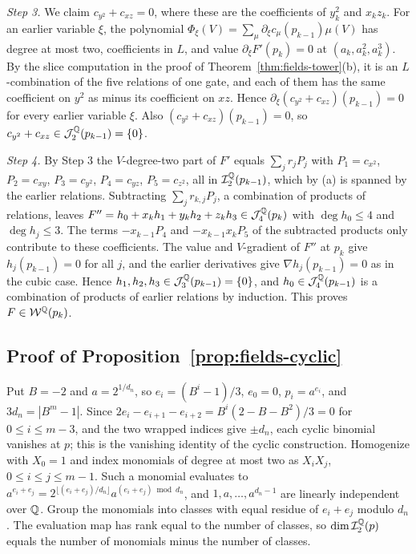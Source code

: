 \emph{Step 3.} We claim $c_{y^2}+c_{xz}=0$, where these are the coefficients
of $y_k^2$ and $x_kz_k$. For an earlier variable $\xi$, the polynomial
$\Phi_\xi(V)=\sum_\mu\partial_\xi c_\mu(p_{k-1})\mu(V)$ has degree at most two,
coefficients in $L$, and value $\partial_\xi F'(p_k)=0$ at
$(a_k,a_k^2,a_k^3)$. By the slice computation in the proof of
Theorem~\ref{thm:fields-tower}(b), it is an $L$-combination of the five
relations of one gate, and each of them has the same coefficient on $y^2$ as
minus its coefficient on $xz$. Hence $\partial_\xi(c_{y^2}+c_{xz})(p_{k-1})=0$
for every earlier variable $\xi$. Also $(c_{y^2}+c_{xz})(p_{k-1})=0$, so
$c_{y^2}+c_{xz}\in\mathcal J_2^\mathbb Q(p_{k-1})=\{0\}$.

\emph{Step 4.} By Step 3 the $V$-degree-two part of $F'$ equals
$\sum_j\hat r_jP_j$ with $P_1=c_{x^2}$, $P_2=c_{xy}$, $P_3=c_{y^2}$,
$P_4=c_{yz}$, $P_5=c_{z^2}$, all in $\mathcal I_2^\mathbb Q(p_{k-1})$, which by (a)
is spanned by the earlier relations. Subtracting $\sum_jr_{k,j}P_j$, a
combination of products of relations, leaves
$F''=h_0+x_kh_1+y_kh_2+z_kh_3\in\mathcal J_4^\mathbb Q(p_k)$ with $\deg h_0\le4$
and $\deg h_j\le3$. The terms $-x_{k-1}P_4$ and $-x_{k-1}x_kP_5$ of the
subtracted products only contribute to these coefficients. The value and
$V$-gradient of $F''$ at $p_k$ give $h_j(p_{k-1})=0$ for all $j$, and the
earlier derivatives give $\nabla h_j(p_{k-1})=0$ as in the cubic case. Hence
$h_1,h_2,h_3\in\mathcal J_3^\mathbb Q(p_{k-1})=\{0\}$, and
$h_0\in\mathcal J_4^\mathbb Q(p_{k-1})$ is a combination of products of earlier
relations by induction. This proves $F\in\mathcal W^\mathbb Q(p_k)$.

\subsection{Proof of Proposition~\ref{prop:fields-cyclic}}
\label{app:fields-cyclic}

Put $B=-2$ and $a=2^{1/d_n}$, so $e_i=(B^i-1)/3$, $e_0=0$, $p_i=a^{e_i}$,
and $3d_n=|B^m-1|$. Since
$2e_i-e_{i+1}-e_{i+2}=B^i(2-B-B^2)/3=0$ for $0\le i\le m-3$, and the two
wrapped indices give $\pm d_n$, each cyclic binomial vanishes at $p$; this is
the vanishing identity of the cyclic construction. Homogenize with $X_0=1$
and index monomials of degree at most two as $X_iX_j$,
$0\le i\le j\le m-1$. Such a monomial evaluates to
$a^{e_i+e_j}=2^{\lfloor(e_i+e_j)/d_n\rfloor}a^{(e_i+e_j)\bmod d_n}$, and
$1,a,\ldots,a^{d_n-1}$ are linearly independent over $\mathbb Q$. Group the monomials
into classes with equal residue of $e_i+e_j$ modulo $d_n$. The evaluation map
has rank equal to the number of classes, so $\dim\mathcal I_2^\mathbb Q(p)$ equals
the number of monomials minus the number of classes.

